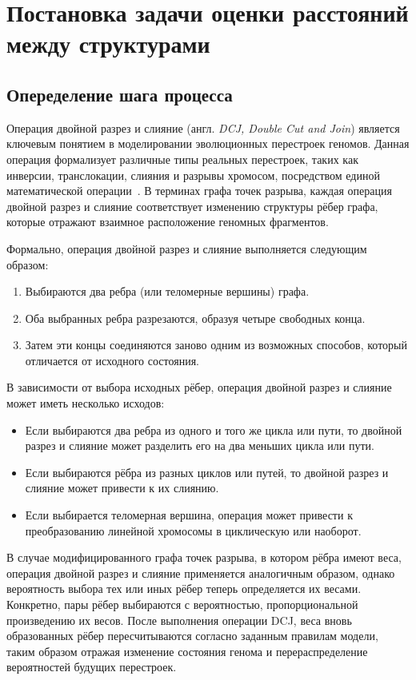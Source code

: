 \section{Постановка задачи оценки расстояний между структурами}
\label{sec:distance_estimation}

\subsection{Опеределение шага процесса}
\label{subsec:dcj_operation}

Операция двойной разрез и слияние (англ. \textit{DCJ, Double Cut and Join}) является ключевым понятием в моделировании эволюционных перестроек геномов.
Данная операция формализует различные типы реальных перестроек, таких как инверсии, транслокации, слияния и разрывы хромосом, посредством единой математической операции~\cite{yancopoulos2005}.
В терминах графа точек разрыва, каждая операция двойной разрез и слияние соответствует изменению структуры рёбер графа, которые отражают взаимное расположение геномных фрагментов.

Формально, операция двойной разрез и слияние выполняется следующим образом:
\begin{enumerate}
    \item Выбираются два ребра (или теломерные вершины) графа.
    \item Оба выбранных ребра разрезаются, образуя четыре свободных конца.
    \item Затем эти концы соединяются заново одним из возможных способов, который отличается от исходного состояния.
\end{enumerate}

В зависимости от выбора исходных рёбер, операция двойной разрез и слияние может иметь несколько исходов:
\begin{itemize}
    \item Если выбираются два ребра из одного и того же цикла или пути, то двойной разрез и слияние может разделить его на два меньших цикла или пути.
    \item Если выбираются рёбра из разных циклов или путей, то двойной разрез и слияние может привести к их слиянию.
    \item Если выбирается теломерная вершина, операция может привести к преобразованию линейной хромосомы в циклическую или наоборот.
\end{itemize}

В случае модифицированного графа точек разрыва, в котором рёбра имеют веса, операция двойной разрез и слияние применяется аналогичным образом, однако вероятность выбора тех или иных рёбер теперь определяется их весами. 
Конкретно, пары рёбер выбираются с вероятностью, пропорциональной произведению их весов.
После выполнения операции DCJ, веса вновь образованных рёбер пересчитываются согласно заданным правилам модели, таким образом отражая изменение состояния генома и перераспределение вероятностей будущих перестроек.

